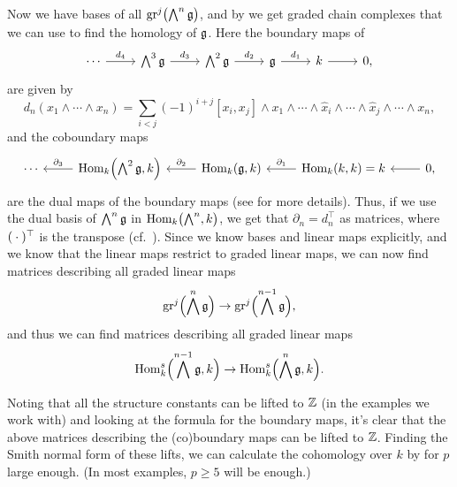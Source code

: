 Now we have bases of all $\operatorname{gr}^{j}\bigl( \bigwedge^{n}\mathfrak{g} \bigr)$, and by \cite[§3.7]{Fuks} we get graded chain complexes that we can use to find the homology of $\mathfrak{g}$. Here the boundary maps of
\[
  \begin{tikzcd}
    \cdots \ar[r,"d_{4}"] & \bigwedge^{3}\lie{g} \ar[r,"d_{3}"] & \bigwedge^{2}\lie{g} \ar[r,"d_{2}"] & \lie{g} \ar[r,"d_{1}"] & k \ar[r] &  0,
  \end{tikzcd}
\]
are given by
\begin{equation*}
  d_{n}(x_{1} \wedge \dotsb \wedge x_{n}) = \sum_{i<j} (-1)^{i+j}[x_{i},x_{j}]\wedge x_{1} \wedge \dotsb \wedge \widehat{x}_{i} \wedge \dotsb \wedge \widehat{x}_{j} \wedge \dotsb \wedge x_{n},
\end{equation*}
and the coboundary maps
\[
  \begin{tikzcd}
    \cdots & \ar[l,"\partial_{3}"'] \Hom_{k}\Bigl( \bigwedge^{2}\lie{g}, k \Bigr) & \ar[l,"\partial_{2}"'] \Hom_{k}(\lie{g},k) & \ar[l,"\partial_{1}"'] \Hom_{k}(k, k) = k &  \ar[l] 0,
  \end{tikzcd}
\]
are the dual maps of the boundary maps (see \cite[§3.1]{Fuks} for more details). Thus, if we use the dual basis of $\bigwedge^{n}\mathfrak{g}$ in $\operatorname{Hom}_{k}\bigl( \bigwedge^{n},k \bigr)$, we get that $\partial_{n} = d_{n}^{\top}$ as matrices, where $(\:\cdot\:)^{\top}$ is the transpose (cf.\ ). Since we know bases and linear maps explicitly, and we know that the linear maps restrict to graded linear maps, we can now find matrices describing all graded linear maps
\begin{equation*}
  \operatorname{gr}^{j} \Bigl( \bigwedge^{n}\mathfrak{g} \Bigr) \to \operatorname{gr}^{j} \Bigl( \bigwedge^{n-1}\mathfrak{g} \Bigr),
\end{equation*}
and thus we can find matrices describing all graded linear maps
\begin{equation*}
  \operatorname{Hom}_{k}^{s}\Bigl( \bigwedge^{n-1}\mathfrak{g},k \Bigr) \to \operatorname{Hom}_{k}^{s}\Bigl( \bigwedge^{n}\mathfrak{g}, k \Bigr).
\end{equation*}

Noting that all the structure constants can be lifted to $\mathbb{Z}$ (in the examples we work with) and looking at the formula for the boundary maps, it's clear that the above matrices describing the (co)boundary maps can be lifted to $\mathbb{Z}$. Finding the Smith normal form of these lifts, we can calculate the cohomology over $k$ by  for $p$ large enough. (In most examples, $p\geq5$ will be enough.)


